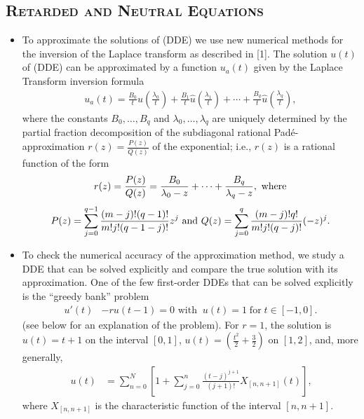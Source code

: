 \documentclass[landscape, a0]{sciposter}
\begin{document}
\begin{multicols}{4}
  \section{\textsc{Retarded and Neutral Equations}}
      \begin{itemize}
    \item To approximate the solutions of (DDE) we use new numerical methods for the inversion of the Laplace transform as described in [1]. The solution $u(t)$ of (DDE) can be approximated by a function $u_a(t)$ given by the Laplace Transform inversion formula
\begin{align}    
u_{a}(t)=\frac{B_{0}}{t}\hat{u}\left(\frac{\lambda_{0}}{t}\right)+ 
\frac{B_{1}}{t} \hat{u}\left(\frac{\lambda_{1}}{t}\right)+\cdots+\frac{B_{q}}{t}
\hat{u}\left(\frac{\lambda_{q}}{t}\right), \tag{*}
\end{align}
where the constants $B_0, \dots, B_q$ and $\lambda_0, \dots, \lambda_q$ are uniquely determined by the partial fraction decomposition of the subdiagonal rational Pad\'e-approximation $r(z)  = \frac{P(z)}{Q(z)}$ of the exponential; i.e., $r(z)$ is a rational function of the form
\begin{align*}
r(z)= \frac{P(z)}{Q(z)} = \frac{B_0}{\lambda_0 - z} + \cdots + \frac{B_q}{\lambda_q - z}, \hbox{ where} 
\end{align*}
$$ P(z)=\sum_{j=0}^{q-1}\frac{(m-j)!(q-1)!}{m!j!(q-1-j)!}z^j
\hbox{ and } Q(z)=\sum_{j=0}^q\frac{(m-j)!q!}{m!j!(q-j)!}(-z)^j.$$
%
    \item To check the numerical accuracy of the approximation method, we study a DDE that can be solved explicitly and compare the true solution with its approximation. One of the few first-order DDEs that can be solved explicitly is the ``greedy bank'' problem
    \begin{align} 
    u'(t)&- ru(t-1)=0\mbox{ with}\;\; u(t)=1\; \mbox{for} \; t\in[-1,0]. \tag{GB}
    \end{align}
    (see below for an explanation of the problem). For $r=1$, the solution is
    $u(t) = t+1$ on the interval $[0,1]$, $u(t)= (\frac{t^{2}}{2}+\frac{3}{2})$ on $[1,2]$, and, more generally,
\begin{align*}
u(t)&=\sum_{n=0}^{N}\left[1+ \sum_{j=0}^{n}\frac{(t-j)^{j+1}}{(j+1)!}X_{[n,n+1]}(t)\right]\mbox{,} 
\end{align*}    
where $X_{[n,n+1]}$ is the characteristic function of the interval $[n,n+1]$.

 \begin{figure} [H]
\centering
{}
\hspace{.3cm}
\end{figure}
\end{itemize}

\end{multicols}
\end{document}
